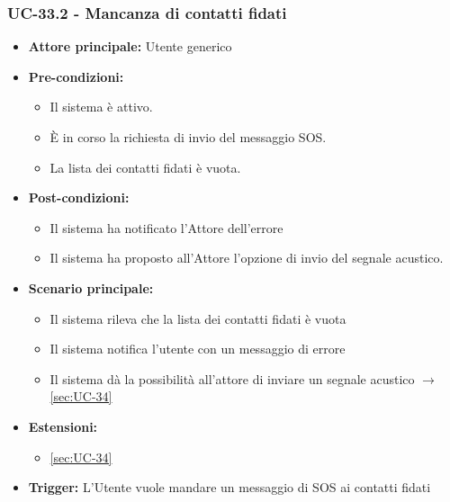\documentclass[a4paper,12pt]{article}
\begin{document}
\subsubsection{UC-33.2 - Mancanza di contatti fidati} \label{sec:UC-33.2}
\begin{itemize}
    \item \textbf{Attore principale:} Utente generico
    \item \textbf{Pre-condizioni:}
    \begin{itemize}
        \item Il sistema è attivo.
	    \item È in corso la richiesta di invio del messaggio SOS.
	    \item La lista dei contatti fidati è vuota.
    \end{itemize}	
    \item \textbf{Post-condizioni:} 
    \begin{itemize}
        \item Il sistema ha notificato l'Attore dell'errore
        \item Il sistema ha proposto all'Attore l'opzione di invio del segnale acustico.
    \end{itemize}
    \item \textbf{Scenario principale:} 
    \begin{itemize}
        \item Il sistema rileva che la lista dei contatti fidati è vuota
        \item Il sistema notifica l'utente con un messaggio di errore
        \item Il sistema dà la possibilità all'attore di inviare un segnale acustico $\rightarrow$ \ref{sec:UC-34}
    \end{itemize}
    \item \textbf{Estensioni:}
    \begin{itemize}
        \item \ref{sec:UC-34}
    \end{itemize}
    \item \textbf{Trigger:} L'Utente vuole mandare un messaggio di SOS ai contatti fidati
\end{itemize}
\end{document}
